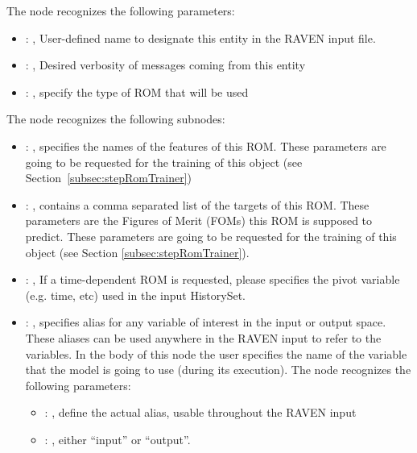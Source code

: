   The  node recognizes the following parameters:
    \begin{itemize}
      \item {}: , 
        User-defined name to designate this entity in the RAVEN input file.
      \item {}: , 
        Desired verbosity of messages coming from this entity
      \item {}: , 
        specify the type of ROM that will be used
  \end{itemize}

  The  node recognizes the following subnodes:
  \begin{itemize}
    \item {}: , 
      specifies the names of the features of this ROM.         \nb These parameters are going to be
      requested for the training of this object         (see Section~\ref{subsec:stepRomTrainer})

    \item {}: , 
      contains a comma separated list of the targets of this ROM. These parameters         are the
      Figures of Merit (FOMs) this ROM is supposed to predict.         \nb These parameters are
      going to be requested for the training of this         object (see Section
      \ref{subsec:stepRomTrainer}).

    \item {}: , 
      If a time-dependent ROM is requested, please specifies the pivot         variable (e.g. time,
      etc) used in the input HistorySet.

    \item {}: , 
      specifies alias for         any variable of interest in the input or output space. These
      aliases can be used anywhere in the RAVEN input to         refer to the variables. In the body
      of this node the user specifies the name of the variable that the model is going to use
      (during its execution).
      The  node recognizes the following parameters:
        \begin{itemize}
          \item {}: , 
            define the actual alias, usable throughout the RAVEN input
          \item {}: , 
            either ``input'' or ``output''.
      \end{itemize}


\end{itemize}
